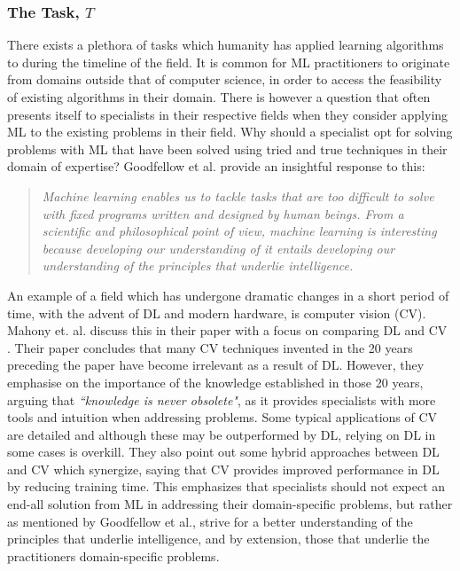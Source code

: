 \subsubsection{The Task, $T$}
There exists a plethora of tasks which humanity has applied learning algorithms
to during the timeline of the field. It is common for ML practitioners to
originate from domains outside that of computer science, in order to access the
feasibility of existing algorithms in their domain. There is however a question
that often presents itself to specialists in their respective fields when they
consider applying ML to the existing problems in their field. Why should a
specialist opt for solving problems with ML that have been solved using tried
and true techniques in their domain of expertise? Goodfellow et al.
\cite{Goodfellow-et-al-2016} provide an insightful response to this:

\begin{quotation}
    \textit{
        Machine learning enables us to tackle tasks that are too difficult to
        solve with fixed programs written and designed by human beings. From a
        scientific and philosophical point of view, machine learning is
        interesting because developing our understanding of it entails
        developing our understanding of the principles that underlie
        intelligence.
    }
\end{quotation}
An example of a field which has undergone dramatic changes in a short period of
time, with the advent of DL and modern hardware, is computer vision (CV). Mahony
et. al. discuss this in their paper with a focus on comparing DL and CV
\cite{Mahony-et-al-2020}. Their paper concludes that many CV techniques invented
in the 20 years preceding the paper have become irrelevant as a result of DL.
However, they emphasise on the importance of the knowledge established in those
20 years, arguing that \textit{``knowledge is never obsolete"}, as it provides
specialists with more tools and intuition when addressing problems. Some typical
applications of CV are detailed and although these may be outperformed by DL,
relying on DL in some cases is overkill. They also point out some hybrid
approaches between DL and CV which synergize, saying that CV provides improved
performance in DL by reducing training time. This emphasizes that specialists
should not expect an end-all solution from ML in addressing their
domain-specific problems, but rather as mentioned by Goodfellow et al., strive
for a better understanding of the principles that underlie intelligence, and by
extension, those that underlie the practitioners domain-specific problems.



